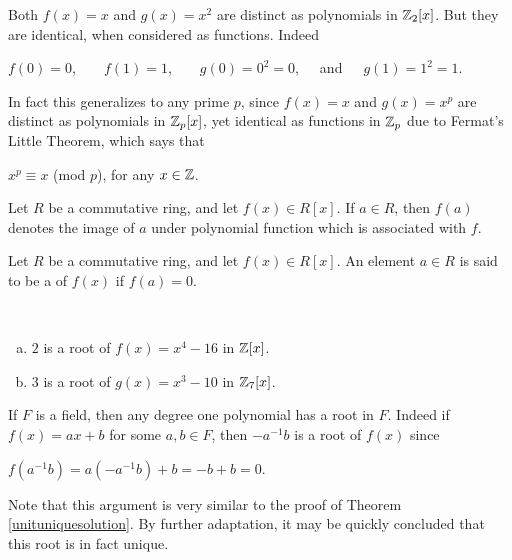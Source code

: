 \documentclass[11pt,fleqn,dvipsnames,usenames]{article}
\newcommand{\p}{\noindent}
\begin{document}
\begin{example}
Both $f(x) = x$ and $g(x) = x^2$ are distinct as polynomials in $\mathbb{Z}_2[x]$.  But they are identical, when considered as functions.  Indeed
\begin{center}
$f(0) = 0$,\ \ \ \ $f(1) = 1$,\ \ \ \ $g(0) = 0^2 = 0$,\ \ \ and\ \ \ $g(1) = 1^2 = 1$.
\end{center}
\p In fact this generalizes to any prime $p$, since $f(x) = x$ and $g(x) = x^{p}$ are distinct as polynomials in $\mathbb{Z}_p[x]$, yet identical as functions in $\mathbb{Z}_p$ due to Fermat's Little Theorem, which says that
\begin{center}
$x^{p}\equiv x$ (mod $p$), for any $x\in\mathbb{Z}$.
\end{center}
\end{example}
%

\notation Let $R$ be a commutative ring, and let $f(x)\in R[x]$.  If $a\in R$, then $f(a)$ denotes the image of $a$ under polynomial function which is associated with $f$.
\vsp

\begin{definition}
Let $R$ be a commutative ring, and let $f(x)\in R[x]$.  An element $a\in R$ is said to be a  of $f(x)$ if $f(a) = 0$.
\end{definition}
\vsp

%
\begin{examples}~
\begin{enumerate}[(a)]
\item $2$ is a root of $f(x) = x^4 - 16$ in $\mathbb{Z}[x]$.
\item $3$ is a root of $g(x) = x^3 - 10$ in $\mathbb{Z}_7[x]$.
\end{enumerate}
\end{examples}
\vsp

%
\begin{example}\label{degreeoneuniqueroot}
If $F$ is a field, then any degree one polynomial has a root in $F$.  Indeed if $f(x) = ax + b$ for some $a,b\in F$, then $-a^{-1}b$ is a root of $f(x)$ since
\begin{center}
$f(a^{-1}b) = a(-a^{-1}b) + b = -b + b = 0$.
\end{center}
\p Note that this argument is very similar to the proof of Theorem \ref{unituniquesolution}.  By further adaptation, it may be quickly concluded that this root is in fact unique.
\end{example}
\vsp
\end{document}
